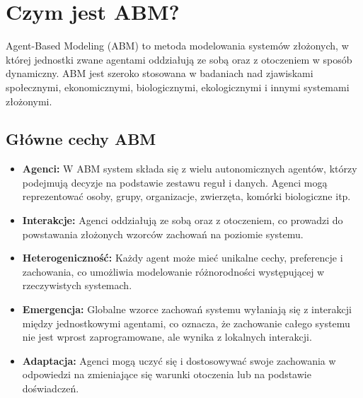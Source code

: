 \section{Czym jest ABM?}
Agent-Based Modeling (ABM) to metoda modelowania systemów złożonych, w której jednostki zwane agentami oddziałują ze sobą oraz z otoczeniem w sposób dynamiczny.
ABM jest szeroko stosowana w badaniach nad zjawiskami społecznymi, ekonomicznymi, biologicznymi, ekologicznymi i innymi systemami złożonymi.

\subsection{Główne cechy ABM}
\begin{itemize}
    \item \textbf{Agenci:} W ABM system składa się z wielu autonomicznych agentów, którzy podejmują decyzje na podstawie zestawu reguł i danych.
          Agenci mogą reprezentować osoby, grupy, organizacje, zwierzęta, komórki biologiczne itp.
    \item \textbf{Interakcje:} Agenci oddziałują ze sobą oraz z otoczeniem, co prowadzi do powstawania złożonych wzorców zachowań na poziomie systemu.
    \item \textbf{Heterogeniczność:} Każdy agent może mieć unikalne cechy, preferencje i zachowania, co umożliwia modelowanie różnorodności występującej w rzeczywistych systemach.
    \item \textbf{Emergencja:} Globalne wzorce zachowań systemu wyłaniają się z interakcji między jednostkowymi agentami, co oznacza, że zachowanie całego systemu nie jest wprost zaprogramowane,
          ale wynika z lokalnych interakcji.
    \item \textbf{Adaptacja:} Agenci mogą uczyć się i dostosowywać swoje zachowania w odpowiedzi na zmieniające się warunki otoczenia lub na podstawie doświadczeń.
\end{itemize}


